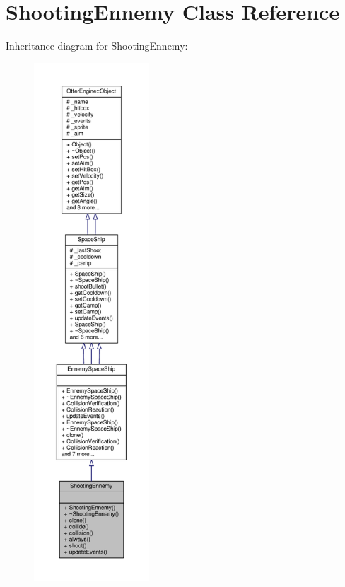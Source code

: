 \hypertarget{class_shooting_ennemy}{}\section{Shooting\+Ennemy Class Reference}
\label{class_shooting_ennemy}


Inheritance diagram for Shooting\+Ennemy\+:\nopagebreak
\begin{figure}[H]
\begin{center}
\leavevmode
\includegraphics[height=550pt]{d2/d23/class_shooting_ennemy__inherit__graph}
\end{center}
\end{figure}


